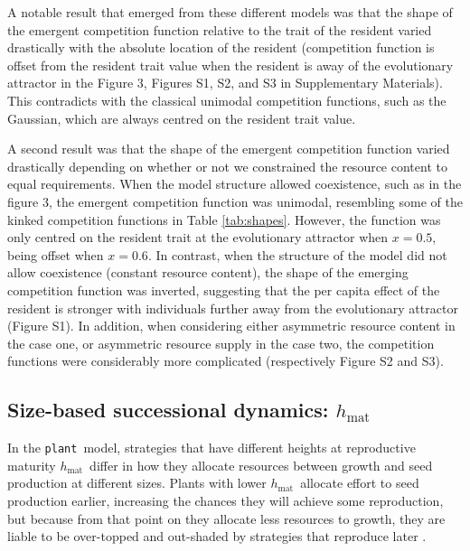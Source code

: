 \documentclass[a4paper,11pt]{article}
\newcommand{\plant}{{\tt plant}}
\newcommand{\hmat}{\ensuremath{h_{\text{mat}}}}
\begin{document}
A notable result that emerged from these different models was that the shape of the emergent competition function relative to the trait of the resident varied drastically with the absolute location of the resident (competition function is offset from the resident trait value when the resident is away of the evolutionary attractor in the Figure 3, Figures S1, S2, and S3 in Supplementary Materials). This contradicts with the classical unimodal competition functions, such as the Gaussian, which are always centred on the resident trait value. 

A second result was that the shape of the emergent competition function varied drastically depending on whether or not we constrained the resource content to equal requirements. When the model structure allowed coexistence, such as in the figure 3, the emergent competition function was unimodal, resembling some of the kinked competition functions in Table \ref{tab:shapes}. However, the function was only centred on the resident trait at the evolutionary attractor when $x = 0.5$, being offset when $x = 0.6$. In contrast, when the structure of the model did not allow coexistence (constant resource content), the shape of the emerging competition function was inverted, suggesting that the per capita effect of the resident is stronger with individuals further away from the evolutionary attractor (Figure S1). In addition, when considering either asymmetric resource content in the case one, or asymmetric resource supply in the case two, the competition functions were considerably more complicated (respectively Figure S2 and S3). 

\subsection{Size-based successional dynamics: \hmat}

In the \plant\ model, strategies that have different heights at reproductive maturity \hmat\ differ in how they allocate resources between growth and seed production at different sizes. Plants with lower \hmat\ allocate effort to seed production earlier, increasing the chances they will achieve some reproduction, but because from that point on they allocate less resources to growth, they are liable to be over-topped and out-shaded by strategies that reproduce later \citep{Falster-2017}.
\end{document}
